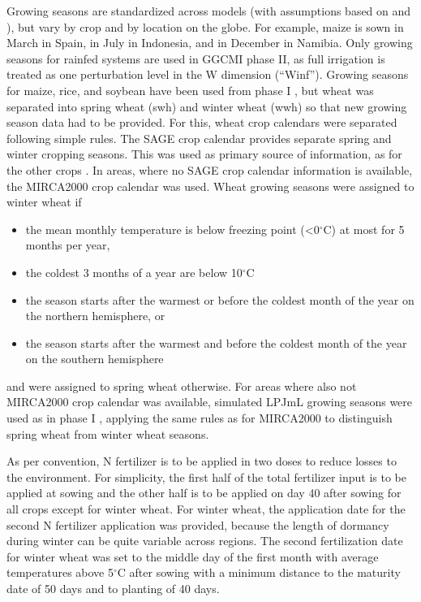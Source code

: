 \documentclass[gmd, manuscript]{copernicus} %
\begin{document}
Growing seasons are standardized across models (with assumptions based on \citet{Sacks2010} and \citet{Portmann2008, Portmann2010}), but vary by crop and by location on the globe. 
For example, maize is sown in March in Spain, in July in Indonesia, and in December in Namibia. 
Only growing seasons for rainfed systems are used in GGCMI phase II, as full irrigation is treated as one perturbation level in the W dimension (``Winf'').
Growing seasons for maize, rice, and soybean have been used from phase I \citep{Elliott2015}, but wheat was separated into spring wheat (swh) and winter wheat (wwh) so that new growing season data had to be provided. 
For this, wheat crop calendars were separated following simple rules. 
The SAGE crop calendar \citep{Sacks2010} provides separate spring and winter cropping seasons. 
This was used as primary source of information, as for the other crops \citep{Elliott2015}. 
In areas, where no SAGE crop calendar information is available, the MIRCA2000 crop calendar \citep{Portmann2010} was used. Wheat growing seasons were assigned to winter wheat if 
\begin{itemize}
\item the mean monthly temperature is below freezing point (<0$^\circ$C) at most for 5 months per year,
\item the coldest 3 months of a year are below 10$^\circ$C
\item the season starts after the warmest or before the coldest month of the year on the northern hemisphere, or
\item the season starts after the warmest and before the coldest month of the year on the southern hemisphere
\end{itemize}
and were assigned to spring wheat otherwise. 
For areas where also not MIRCA2000 crop calendar was available, simulated LPJmL growing seasons \citep{waha2012climate} were used as in phase I \citep{Elliott2015}, applying the same rules as for MIRCA2000 to distinguish spring wheat from winter wheat seasons.

As per convention, N fertilizer is to be applied in two doses to reduce losses to the environment. For simplicity, the first half of the total fertilizer input is to be applied at sowing and the other half is to be applied on day 40 after sowing for all crops except for winter wheat. For winter wheat, the application date for the second N fertilizer application was provided, because the length of dormancy during winter can be quite variable across regions. The second fertilization date for winter wheat was set to the middle day of the first month with average temperatures above 5$^\circ$C after sowing with a minimum distance to the maturity date of 50 days and to planting of 40 days.
\end{document}
